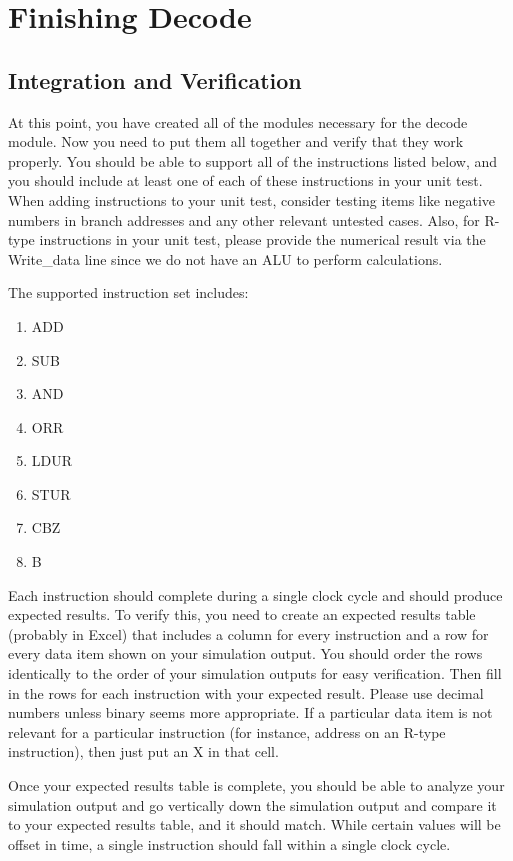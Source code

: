 \chapter{Finishing Decode}

\section{Integration and Verification}
At this point, you have created all of the modules necessary for the decode module.  Now you need to put them all together and verify that they work properly.  You should be able to support all of the instructions listed below, and you should include at least one of each of these instructions in your unit test.  When adding instructions to your unit test, consider testing items like negative numbers in branch addresses and any other relevant untested cases.  Also, for R-type instructions in your unit test, please provide the numerical result via the Write\_data line since we do not have an ALU to perform calculations.  

The supported instruction set includes:
\begin{enumerate}
	\item ADD
	\item SUB
	\item AND
	\item ORR
	\item LDUR
	\item STUR
	\item CBZ
	\item B
\end{enumerate}

Each instruction should complete during a single clock cycle and should produce expected results.  To verify this, you need to create an expected results table (probably in Excel) that includes a column for every instruction and a row for every data item shown on your simulation output.  You should order the rows identically to the order of your simulation outputs for easy verification.  Then fill in the rows for each instruction with your expected result.  Please use decimal numbers unless binary seems more appropriate.  If a particular data item is not relevant for a particular instruction (for instance, address on an R-type instruction), then just put an X in that cell.

Once your expected results table is complete, you should be able to analyze your simulation output and go vertically down the simulation output and compare it to your expected results table, and it should match.  While certain values will be offset in time, a single instruction should fall within a single clock cycle.  

